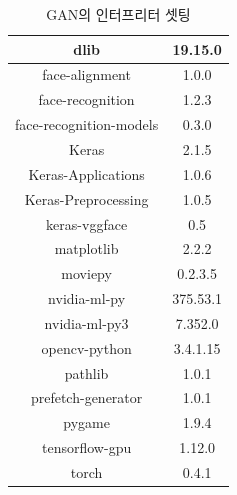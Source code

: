 \documentclass[chapter,oneside]{oblivoir}
\begin{document}
\begin{table}[h!]
\centering
\begin{tabular}{|c|c|}
    \hline\hline
    dlib & 19.15.0 \\ \hline
    face-alignment & 1.0.0  \\ \hline
    face-recognition & 1.2.3  \\ \hline
    face-recognition-models & 0.3.0  \\ \hline
    Keras & 2.1.5  \\ \hline
    Keras-Applications & 1.0.6  \\ \hline
    Keras-Preprocessing & 1.0.5  \\ \hline
    keras-vggface  & 0.5  \\ \hline
    matplotlib & 2.2.2  \\ \hline
    moviepy & 0.2.3.5  \\ \hline
    nvidia-ml-py &  375.53.1  \\ \hline
    nvidia-ml-py3 &  7.352.0  \\ \hline
    opencv-python & 3.4.1.15  \\ \hline
    pathlib & 1.0.1 \\ \hline 
    prefetch-generator &  1.0.1  \\ \hline
    pygame & 1.9.4  \\ \hline
    tensorflow-gpu &  1.12.0  \\ \hline
    torch & 0.4.1  \\ \hline
    \hline\hline
\end{tabular}
\caption{GAN의 인터프리터 셋팅 }
\end{table}
\end{document}
